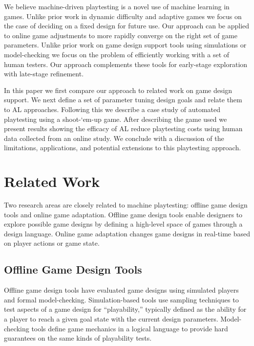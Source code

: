 \documentclass{sig-alternate}
\begin{document}
We believe machine-driven playtesting is a novel use of machine learning in games.
Unlike prior work in dynamic difficulty and adaptive games we focus on the case of deciding on a fixed design for future use.
Our approach can be applied to online game adjustments to more rapidly converge on the right set of game parameters.
Unlike prior work on game design support tools using simulations or model-checking we focus on the problem of efficiently working with a set of human testers.
Our approach complements these tools for early-stage exploration with late-stage refinement.

In this paper we first compare our approach to related work on game design support.
We next define a set of parameter tuning design goals and relate them to AL approaches.
Following this we describe a case study of automated playtesting using a shoot-`em-up game.
After describing the game used we present results showing the efficacy of AL reduce playtesting costs using human data collected from an online study.
We conclude with a discussion of the limitations, applications, and potential extensions to this playtesting approach.




\section{Related Work}

Two research areas are closely related to machine playtesting: offline game design tools and online game adaptation.
Offline game design tools enable designers to explore possible game designs by defining a high-level space of games through a design language.
Online game adaptation changes game designs in real-time based on player actions or game state.



\subsection{Offline Game Design Tools}
Offline game design tools have evaluated game designs using simulated players and formal model-checking.
Simulation-based tools use sampling techniques to test aspects of a game design for ``playability,'' typically defined as the ability for a player to reach a given goal state with the current design parameters.
Model-checking tools define game mechanics in a logical language to provide hard guarantees on the same kinds of playability tests.
\end{document}

